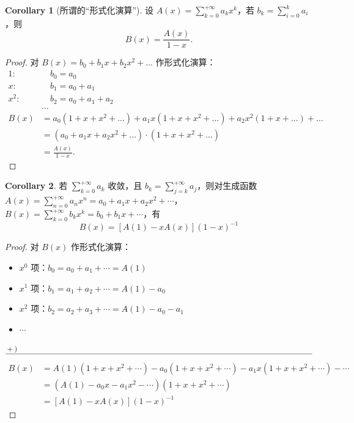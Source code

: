 \documentclass[oneside]{book}
\theoremstyle{definition}
\newtheorem{corollary}{Corollary}[section]
\begin{document}
	\begin{corollary}[所谓的“形式化演算”]
		设 \( A(x) = \sum_{k=0}^{+\infty} a_k x^k \)，若 \( b_k = \sum_{i=0}^k a_i \)，则
		\[
		B(x) = \frac{A(x)}{1-x}.
		\]
	\end{corollary}
	\begin{proof}
		对 \( B(x) = b_0 + b_1 x + b_2 x^2 + \dots \) 作形式化演算：
		\[
		\begin{aligned}
			1: &\quad b_0 = a_0 \\
			x: &\quad b_1 = a_0 + a_1 \\
			x^2: &\quad b_2 = a_0 + a_1 + a_2 \\
			&\dots \\
			\hline
			B(x) &= a_0(1 + x + x^2 + \dots) + a_1 x(1 + x + x^2 + \dots) + a_2 x^2(1 + x + \dots) + \dots \\
			&= \left( a_0 + a_1 x + a_2 x^2 + \dots \right) \cdot \left( 1 + x + x^2 + \dots \right) \\
			&= \frac{A(x)}{1-x}.
		\end{aligned}
		\]
	\end{proof}
\begin{corollary}
	若 \( \sum_{k=0}^{+\infty} a_k \) 收敛，且 \( b_k = \sum_{j=k}^{+\infty} a_j \)，则对生成函数 \( A(x) = \sum_{n=0}^{+\infty} a_n x^n = a_0 + a_1 x + a_2 x^2 + \cdots \)，\( B(x) = \sum_{k=0}^{+\infty} b_k x^k = b_0 + b_1 x + \cdots \)，有
	\[
	B(x) = \left[ A(1) - xA(x) \right] (1 - x)^{-1}
	\]
\end{corollary}

\begin{proof}
	对 \( B(x) \) 作形式化演算：
	\begin{itemize}
		\item \( x^0 \) 项：\( b_0 = a_0 + a_1 + \cdots = A(1) \)
		\item \( x^1 \) 项：\( b_1 = a_1 + a_2 + \cdots = A(1) - a_0 \)
		\item \( x^2 \) 项：\( b_2 = a_2 + a_3 + \cdots = A(1) - a_0 - a_1 \)
		\item \(\cdots\)
	\end{itemize}
	\[
	\begin{aligned}
		&+{)}\quad\quad\quad\quad\quad\quad\quad\quad\quad\quad\quad\quad\quad\quad\quad\quad\quad\quad\quad\quad\quad\quad\quad\quad\quad\quad\quad\quad\quad\quad\quad\quad\quad\quad\quad\quad\quad\quad\quad\quad\quad\\
		\hline
	\end{aligned}\]
	\[
	\begin{aligned}
		B(x) &= A(1)(1 + x + x^2 + \cdots) - a_0(1 + x + x^2 + \cdots) - a_1 x(1 + x + x^2 + \cdots) - \cdots \\
		&= \left( A(1) - a_0 x - a_1 x^2 - \cdots \right) (1 + x + x^2 + \cdots) \\
		&= \left[ A(1) - xA(x) \right] (1 - x)^{-1}
	\end{aligned}
	\]
\end{proof}
\end{document}
